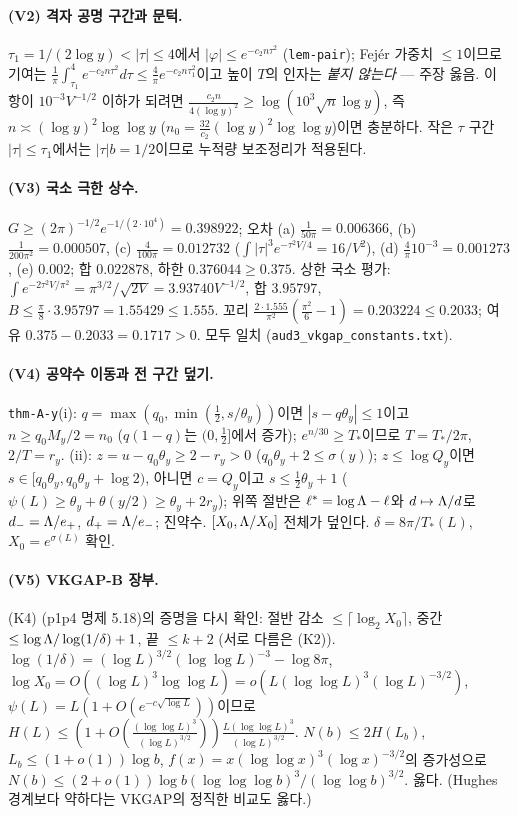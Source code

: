 \paragraph{(V2) 격자 공명 구간과 문턱.}
$\tau_1=1/(2\log y)<|\tau|\le4$에서 $|\varphi|\le e^{-c_2n\tau^2}$ (\texttt{lem-pair}); Fejér 가중치 $\le1$이므로 기여는
$\frac1\pi\int_{\tau_1}^4e^{-c_2n\tau^2}d\tau\le\frac4\pi e^{-c_2n\tau_1^2}$이고 높이 $T$의 인자는 \emph{붙지 않는다} --- 주장 옳음.
이 항이 $10^{-3}V^{-1/2}$ 이하가 되려면 $\frac{c_2n}{4(\log y)^2}\ge\log(10^3\sqrt n\log y)$, 즉 $n\asymp(\log y)^2\log\log y$ ($n_0=\frac{32}{c_2}(\log y)^2\log\log y$)이면 충분하다.
작은 $\tau$ 구간 $|\tau|\le\tau_1$에서는 $|\tau|b=1/2$이므로 누적량 보조정리가 적용된다.

\paragraph{(V3) 국소 극한 상수.}
$G\ge(2\pi)^{-1/2}e^{-1/(2\cdot10^4)}=0.398922$; 오차 (a) $\frac1{50\pi}=0.006366$, (b) $\frac1{200\pi^2}=0.000507$, (c) $\frac{4}{100\pi}=0.012732$
($\int|\tau|^3e^{-\tau^2V/4}=16/V^2$), (d) $\frac4\pi10^{-3}=0.001273$, (e) $0.002$; 합 $0.022878$, 하한 $0.376044\ge0.375$.
상한 국소 평가: $\int e^{-2\tau^2V/\pi^2}=\pi^{3/2}/\sqrt{2V}=3.93740V^{-1/2}$, 합 $3.95797$, $B\le\frac\pi8\cdot3.95797=1.55429\le1.555$.
꼬리 $\frac{2\cdot1.555}{\pi^2}(\frac{\pi^2}6-1)=0.203224\le0.2033$; 여유 $0.375-0.2033=0.1717>0$. 모두 일치 (\texttt{aud3\_vkgap\_constants.txt}).

\paragraph{(V4) 공약수 이동과 전 구간 덮기.}
\texttt{thm-A-y}(i): $q=\max(q_0,\min(\frac12,s/\theta_y))$이면 $|s-q\theta_y|\le1$이고 $n\ge q_0M_y/2=n_0$ ($q(1-q)$는 $(0,\frac12]$에서 증가);
$e^{n/30}\ge T_*$이므로 $T=T_*/2\pi$, $2/T=r_y$. (ii): $z=u-q_0\theta_y\ge2-r_y>0$ ($q_0\theta_y+2\le\sigma(y)$);
$z\le\log Q_y$이면 $s\in[q_0\theta_y,q_0\theta_y+\log2)$, 아니면 $c=Q_y$이고 $s\le\frac12\theta_y+1$ ($\psi(L)\ge\theta_y+\theta(y/2)\ge\theta_y+2r_y$);
위쪽 절반은 $\ell^*=\log\Lambda-\ell$와 $d\mapsto\Lambda/d$로 $d_-=\Lambda/e_+$, $d_+=\Lambda/e_-$; 진약수. $[X_0,\Lambda/X_0]$ 전체가 덮인다. $\delta=8\pi/T_*(L)$, $X_0=e^{\sigma(L)}$ 확인.

\paragraph{(V5) VKGAP-B 장부.}
(K4) (p1p4 명제 5.18)의 증명을 다시 확인: 절반 감소 $\le\lceil\log_2X_0\rceil$, 중간 $\le\log\Lambda/\log(1/\delta)+1$, 끝 $\le k+2$ (서로 다름은 (K2)).
$\log(1/\delta)=(\log L)^{3/2}(\log\log L)^{-3}-\log8\pi$, $\log X_0=O((\log L)^3\log\log L)=o(L(\log\log L)^3(\log L)^{-3/2})$, $\psi(L)=L(1+O(e^{-c\sqrt{\log L}}))$이므로
$H(L)\le(1+O(\frac{(\log\log L)^3}{(\log L)^{3/2}}))\frac{L(\log\log L)^3}{(\log L)^{3/2}}$. $N(b)\le2H(L_b)$, $L_b\le(1+o(1))\log b$, $f(x)=x(\log\log x)^3(\log x)^{-3/2}$의 증가성으로
$N(b)\le(2+o(1))\log b(\log\log\log b)^3/(\log\log b)^{3/2}$. 옳다. (Hughes 경계보다 약하다는 VKGAP의 정직한 비교도 옳다.)

